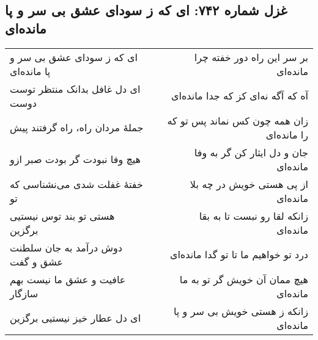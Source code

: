 \begin{center}
\section*{غزل شماره ۷۴۲: ای که ز سودای عشق بی سر و پا مانده‌ای}
\label{sec:742}
\begin{longtable}{l p{0.5cm} r}
ای که ز سودای عشق بی سر و پا مانده‌ای
&&
بر سر این راه دور خفته چرا مانده‌ای
\\
ای دل غافل بدانک منتظر توست دوست
&&
آه که آگه نه‌ای کز که جدا مانده‌ای
\\
جملهٔ مردان راه، راه گرفتند پیش
&&
زان همه چون کس نماند پس تو که را مانده‌ای
\\
هیچ وفا نبودت گر بودت صبر ازو
&&
جان و دل ایثار کن گر به وفا مانده‌ای
\\
خفتهٔ غفلت شدی می‌نشناسی که تو
&&
از پی هستی خویش در چه بلا مانده‌ای
\\
هستی تو بند توس نیستیی برگزین
&&
زانکه لقا رو نبست تا به بقا مانده‌ای
\\
دوش درآمد به جان سلطنت عشق و گفت
&&
درد تو خواهیم ما تا تو گدا مانده‌ای
\\
عافیت و عشق ما نیست بهم سازگار
&&
هیچ ممان آن خویش گر تو به ما مانده‌ای
\\
ای دل عطار خیز نیستیی برگزین
&&
زانکه ز هستی خویش بی سر و پا مانده‌ای
\\
\end{longtable}
\end{center}

